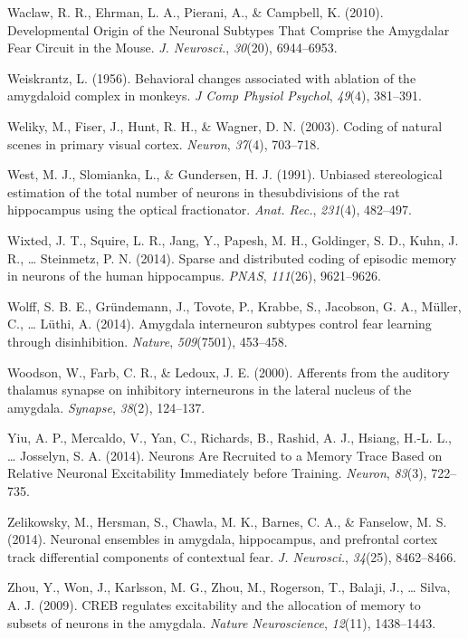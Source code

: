 \documentclass[12pt,a4paper,]{report}
\begin{document}
\hypertarget{ref-waclawux5fdevelopmentalux5f2010}{}
Waclaw, R. R., Ehrman, L. A., Pierani, A., \& Campbell, K. (2010).
Developmental Origin of the Neuronal Subtypes That Comprise the
Amygdalar Fear Circuit in the Mouse. \emph{J. Neurosci.}, \emph{30}(20),
6944--6953.

\hypertarget{ref-weiskrantzux5fbehavioralux5f1956}{}
Weiskrantz, L. (1956). Behavioral changes associated with ablation of
the amygdaloid complex in monkeys. \emph{J Comp Physiol Psychol},
\emph{49}(4), 381--391.

\hypertarget{ref-welikyux5fcodingux5f2003}{}
Weliky, M., Fiser, J., Hunt, R. H., \& Wagner, D. N. (2003). Coding of
natural scenes in primary visual cortex. \emph{Neuron}, \emph{37}(4),
703--718.

\hypertarget{ref-westux5funbiasedux5f1991}{}
West, M. J., Slomianka, L., \& Gundersen, H. J. (1991). Unbiased
stereological estimation of the total number of neurons in
thesubdivisions of the rat hippocampus using the optical fractionator.
\emph{Anat. Rec.}, \emph{231}(4), 482--497.

\hypertarget{ref-wixtedux5fsparseux5f2014}{}
Wixted, J. T., Squire, L. R., Jang, Y., Papesh, M. H., Goldinger, S. D.,
Kuhn, J. R., \ldots{} Steinmetz, P. N. (2014). Sparse and distributed
coding of episodic memory in neurons of the human hippocampus.
\emph{PNAS}, \emph{111}(26), 9621--9626.

\hypertarget{ref-wolffux5famygdalaux5f2014}{}
Wolff, S. B. E., Gründemann, J., Tovote, P., Krabbe, S., Jacobson, G.
A., Müller, C., \ldots{} Lüthi, A. (2014). Amygdala interneuron subtypes
control fear learning through disinhibition. \emph{Nature},
\emph{509}(7501), 453--458.

\hypertarget{ref-woodsonux5fafferentsux5f2000}{}
Woodson, W., Farb, C. R., \& Ledoux, J. E. (2000). Afferents from the
auditory thalamus synapse on inhibitory interneurons in the lateral
nucleus of the amygdala. \emph{Synapse}, \emph{38}(2), 124--137.

\hypertarget{ref-yiuux5fneuronsux5f2014}{}
Yiu, A. P., Mercaldo, V., Yan, C., Richards, B., Rashid, A. J., Hsiang,
H.-L. L., \ldots{} Josselyn, S. A. (2014). Neurons Are Recruited to a
Memory Trace Based on Relative Neuronal Excitability Immediately before
Training. \emph{Neuron}, \emph{83}(3), 722--735.

\hypertarget{ref-zelikowskyux5fneuronalux5f2014}{}
Zelikowsky, M., Hersman, S., Chawla, M. K., Barnes, C. A., \& Fanselow,
M. S. (2014). Neuronal ensembles in amygdala, hippocampus, and
prefrontal cortex track differential components of contextual fear.
\emph{J. Neurosci.}, \emph{34}(25), 8462--8466.

\hypertarget{ref-zhouux5fcrebux5f2009}{}
Zhou, Y., Won, J., Karlsson, M. G., Zhou, M., Rogerson, T., Balaji, J.,
\ldots{} Silva, A. J. (2009). CREB regulates excitability and the
allocation of memory to subsets of neurons in the amygdala. \emph{Nature
Neuroscience}, \emph{12}(11), 1438--1443.
\end{document}
